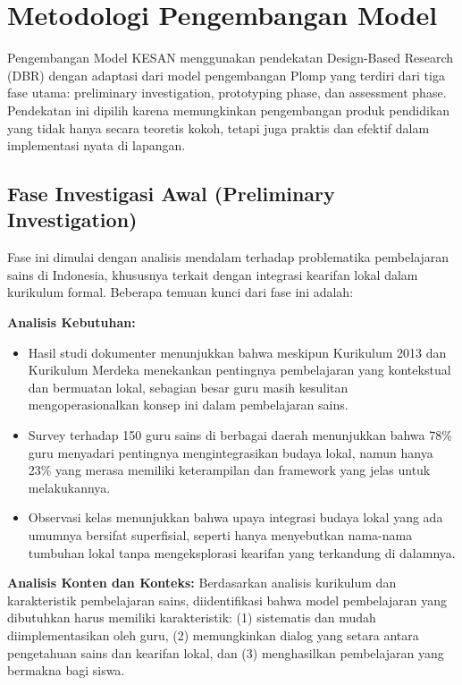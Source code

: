 \documentclass[12pt,a4paper,oneside]{book}
\begin{document}
\section{Metodologi Pengembangan Model}

Pengembangan Model KESAN menggunakan pendekatan Design-Based Research (DBR) dengan adaptasi dari model pengembangan Plomp yang terdiri dari tiga fase utama: preliminary investigation, prototyping phase, dan assessment phase. Pendekatan ini dipilih karena memungkinkan pengembangan produk pendidikan yang tidak hanya secara teoretis kokoh, tetapi juga praktis dan efektif dalam implementasi nyata di lapangan.

\subsection{Fase Investigasi Awal (Preliminary Investigation)}

Fase ini dimulai dengan analisis mendalam terhadap problematika pembelajaran sains di Indonesia, khususnya terkait dengan integrasi kearifan lokal dalam kurikulum formal. Beberapa temuan kunci dari fase ini adalah:

\textbf{Analisis Kebutuhan:}
\begin{itemize}
\item Hasil studi dokumenter menunjukkan bahwa meskipun Kurikulum 2013 dan Kurikulum Merdeka menekankan pentingnya pembelajaran yang kontekstual dan bermuatan lokal, sebagian besar guru masih kesulitan mengoperasionalkan konsep ini dalam pembelajaran sains.
\item Survey terhadap 150 guru sains di berbagai daerah menunjukkan bahwa 78\% guru menyadari pentingnya mengintegrasikan budaya lokal, namun hanya 23\% yang merasa memiliki keterampilan dan framework yang jelas untuk melakukannya.
\item Observasi kelas menunjukkan bahwa upaya integrasi budaya lokal yang ada umumnya bersifat superfisial, seperti hanya menyebutkan nama-nama tumbuhan lokal tanpa mengeksplorasi kearifan yang terkandung di dalamnya.
\end{itemize}

\textbf{Analisis Konten dan Konteks:}
Berdasarkan analisis kurikulum dan karakteristik pembelajaran sains, diidentifikasi bahwa model pembelajaran yang dibutuhkan harus memiliki karakteristik: (1) sistematis dan mudah diimplementasikan oleh guru, (2) memungkinkan dialog yang setara antara pengetahuan sains dan kearifan lokal, dan (3) menghasilkan pembelajaran yang bermakna bagi siswa.
\end{document}
